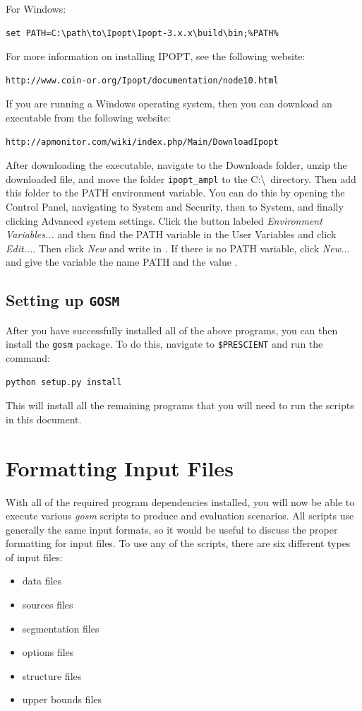 \documentclass[11pt]{article}
\begin{document}
For Windows:

\begin{verbatim}
set PATH=C:\path\to\Ipopt\Ipopt-3.x.x\build\bin;%PATH%
\end{verbatim}

For more information on installing IPOPT, see the following website:
\begin{verbatim}
http://www.coin-or.org/Ipopt/documentation/node10.html
\end{verbatim}

If you are running a Windows operating system, then you can download an executable from the following website:
\begin{verbatim}
http://apmonitor.com/wiki/index.php/Main/DownloadIpopt
\end{verbatim}
After downloading the executable, navigate to the Downloads folder, unzip the downloaded file, and move the folder \texttt{ipopt\_ampl} to the C:\textbackslash\ directory. Then add this folder to the PATH environment variable. You can do this by opening the Control Panel, navigating to System and Security, then to System, and finally clicking Advanced system settings. Click the button labeled \emph{Environment Variables...} and then find the PATH variable in the User Variables and click \emph{Edit...}. Then click {\it New} and write in . If there is no PATH variable, click \emph{New...} and give the variable the name PATH  and the value .

\subsection{Setting up \texttt{GOSM}}
After you have successfully installed all of the above programs, you can then install the \texttt{gosm} package. To do this, navigate to \texttt{\$PRESCIENT} and run the command:
\begin{verbatim}
python setup.py install
\end{verbatim}
This will install all the remaining programs that you will need to run the scripts in this document.

\section{Formatting Input Files}

With all of the required program dependencies installed, you will now be able to execute various \textit{gosm} scripts to produce and evaluation scenarios. All scripts use generally the same input formats, so it would be useful
to discuss the proper formatting for input files. To use any of the scripts, there are six different types of input files:
\begin{itemize}
	\item data files
	\item sources files
	\item segmentation files
	\item options files
	\item structure files
	\item upper bounds files
\end{itemize}
\end{document}
